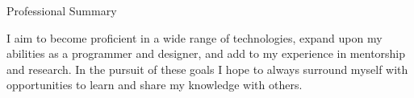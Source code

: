 \begin{tmrsection}{Professional Summary}


\tmrtextentry
	{I aim to become proficient in a wide range of technologies, expand upon my abilities as a programmer and designer, and add to my experience in mentorship and research. In the pursuit of these goals I hope to always surround myself with opportunities to learn and share my knowledge with others.}
	


\end{tmrsection}